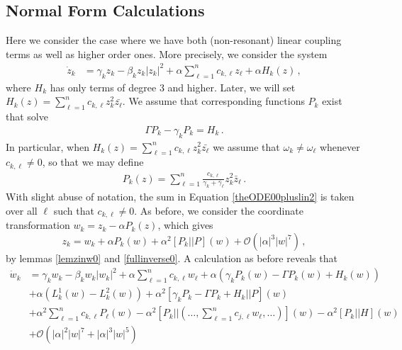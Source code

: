 \documentclass[12pt]{article}
\renewcommand{\mathcal}{\mathscr}
\theoremstyle{plain}
\theoremstyle{definition}
\theoremstyle{remark}
\theoremstyle{remark}
\begin{document}
{\subsection{Normal Form Calculations}\label{Normal_form_calculations}
Here we consider the case where we have both (non-resonant) linear coupling terms as well as higher order ones. More precisely, we consider the system
\begin{align}\label{theODE00pluslin}
\dot{z}_k &= \gamma_kz_k - \beta_k z_k|z_k|^2 + \alpha \sum_{\ell =1}^n c_{k,\ell}z_{\ell} + \alpha H_k(z) \, ,
\end{align}
where $H_k$ has only terms of degree $3$ and higher. Later, we will set $H_k(z) =  \sum_{\ell =1}^n c_{k,\ell}z_k^2\bar{z_{\ell}}$. We assume that corresponding functions $P_k$ exist that solve
\begin{align}\label{theODE00pluslin1}
\Gamma P_k - \gamma_k P_k = H_k\, .
\end{align}
In particular, when $H_k(z) =  \sum_{\ell =1}^n c_{k,\ell}z_k^2\bar{z_{\ell}}$ we assume that $\omega_k \not= \omega_{\ell}$ whenever $c_{k,\ell} \not= 0$, so that we may define
\begin{align}\label{theODE00pluslin2}
P_k(z) = \sum_{\ell =1}^n \frac{c_{k,\ell}}{\gamma_k + \bar{\gamma}_{\ell}}z_k^2\bar{z}_{\ell} \, .
\end{align}
With slight abuse of notation, the sum in Equation \eqref{theODE00pluslin2} is taken over all $\ell$ such that $c_{k,\ell} \not= 0$. As before, we consider the coordinate transformation $w_k = z_k - \alpha P_k(z)$, which gives 
\begin{equation}\label{expresssss122}
z_k = w_k + \alpha P_k(w) + \alpha^2 [P_k||P](w) + \mathcal{O}(|\alpha|^3|w|^7)\, ,
\end{equation}
by lemmas \ref{lemzinw0} and \ref{fullinverse0}. A calculation as before reveals that 
\begin{align}
\dot{w}_k &= \gamma_kw_k - \beta_k w_k|w_k|^2 + \alpha \sum_{\ell =1}^n c_{k,\ell}w_{\ell} + \alpha (\gamma_kP_k(w) - \Gamma P_k(w) + H_k(w)) \\ \nonumber
&+  \alpha(L^1_k(w) - L^2_k(w)) + \alpha^2[\gamma_kP_k - \Gamma P_k + H_k || P](w) \\ \nonumber
&+\alpha^2\sum_{\ell =1}^n c_{k,\ell}P_{\ell}(w) - \alpha^2[P_k|| (\dots, \sum_{\ell =1}^n c_{j,\ell}w_{\ell}, \dots )](w) - \alpha^2[P_k || H](w) \\ \nonumber
&+ \mathcal{O}(|\alpha|^2|w|^7 + |\alpha|^3|w|^5) \\ \nonumber

\end{align}}
\end{document}
